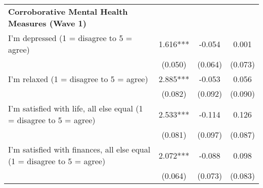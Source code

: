 \begin{ThreePartTable}
\begin{table}[tbp]
\begin{tabular}{lccc}
\textbf{Corroborative Mental Health Measures (Wave 1)} & & & \\ 
 I'm depressed (1 = disagree to 5 = agree) & 1.616*** & -0.054 & 0.001 \\ [0.1em] 
                   &      (0.050)     &      (0.064)     &      (0.073)     \\ [0.1em] 
 I'm relaxed (1 = disagree to 5 = agree) & 2.885*** & -0.053 & 0.056 \\ [0.1em] 
                   &      (0.082)     &      (0.092)     &      (0.090)     \\ [0.1em] 
 I'm satisfied with life, all else equal (1 = disagree to 5 = agree) & 2.533*** & -0.114 & 0.126 \\ [0.1em] 
                   &      (0.081)     &      (0.097)     &      (0.087)     \\ [0.1em] 
 I'm satisfied with finances, all else equal (1 = disagree to 5 = agree) & 2.072*** & -0.088 & 0.098 \\ [0.1em] 
                   &      (0.064)     &      (0.073)     &      (0.083)     \\ [0.1em] 
\hline\hline
\end{tabular}
\insertTableNotes
\end{table}
\end{ThreePartTable}
